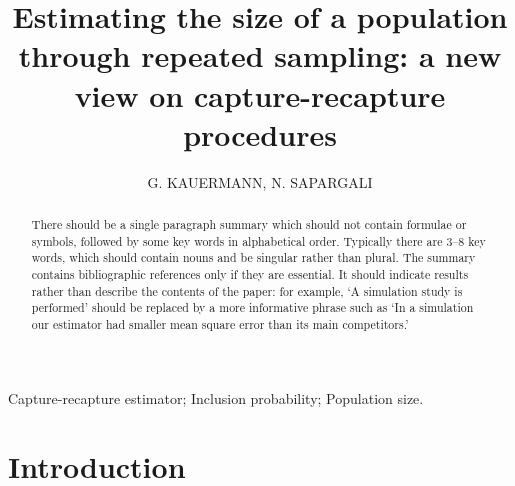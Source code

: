\documentclass[manuscript]{biometrika}
\begin{document}



\title{Estimating the size of a population through repeated sampling: a new view on capture-recapture procedures}

\author{G. KAUERMANN, N. SAPARGALI}

\maketitle

\begin{abstract}
There should be a single paragraph summary which should not contain formulae or symbols, followed by some key words in alphabetical order.  Typically there are 3--8 key words, which should contain nouns and be singular rather than plural.  The summary contains bibliographic references only if they are essential.  It should indicate results rather than describe the contents of the paper: for example, `A simulation study is performed' should be replaced by a more informative phrase such as `In a simulation our estimator had smaller mean square error than its main competitors.'
\end{abstract}

\begin{keywords}
Capture-recapture estimator; Inclusion probability; Population size.
\end{keywords}

\section{Introduction}
\end{document}
